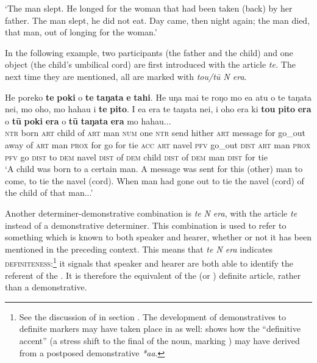 \glt
‘The man slept. He longed for the woman that had been taken (back) by her father. The man slept, he did not eat. Day came, then night again; the man died, that man, out of longing for the woman.’ \textstyleExampleref{[Mtx-5-02.057-060]}
\z

In the following example, two participants (the father and the child) and one object (the child’s umbilical cord) are first introduced with the article \textit{te.} The next time they are mentioned, all are marked with \textit{tou/tū N era}.

\ea\label{ex:4.200}
\gll He poreko \textbf{te} \textbf{poki} o \textbf{te} \textbf{taŋata} \textbf{e} \textbf{tahi}. He uŋa mai te roŋo mo e{\ꞌ}a atu o te taŋata nei, mo oho, mo haha{\ꞌ}u i \textbf{te} \textbf{pito}. I e{\ꞌ}a era te taŋata nei, i oho era ki \textbf{tou} \textbf{pito} \textbf{era} o \textbf{tū} \textbf{poki} \textbf{era}  o \textbf{tū} \textbf{taŋata} \textbf{era} mo haha{\ꞌ}u...\\
\textsc{ntr} born \textsc{art} child of \textsc{art} man \textsc{num} one \textsc{ntr} send hither \textsc{art} message for go\_out away of \textsc{art} man \textsc{prox} for go for tie \textsc{acc} \textsc{art} navel \textsc{pfv} go\_out \textsc{dist} \textsc{art} man \textsc{prox} \textsc{pfv} go \textsc{dist} to \textsc{dem} navel \textsc{dist} of \textsc{dem} child \textsc{dist}  of \textsc{dem} man \textsc{dist} for tie\\

\glt 
‘A child was born to a certain man. A message was sent for this (other) man to come, to tie the navel (cord). When man had gone out to tie the navel (cord){\rmfnm} of the child of that man...’ \textstyleExampleref{[Blx-2-1.001-005]}
\z
{}

Another determiner-demonstrative combination is \textit{te} \textit{N era}, with the article \textit{te} instead of a demonstrative determiner. This combination is used to refer to something which is known to both speaker and hearer, whether or not it has been mentioned in the preceding context. This means that \textit{te N era} indicates \textsc{definiteness}:\footnote{\label{fn:219}See the discussion of  in section . The development of demonstratives to definite markers may have taken place in  as well: \citet{Clark1974} shows how the “definitive accent” (a stress shift to the final  of the noun, marking ) may have derived from a postposed demonstrative \textit{*aa}.} it signals that speaker and hearer are both able to identify the referent of the . It is therefore the equivalent of the  (or ) definite article, rather than a demonstrative. 

